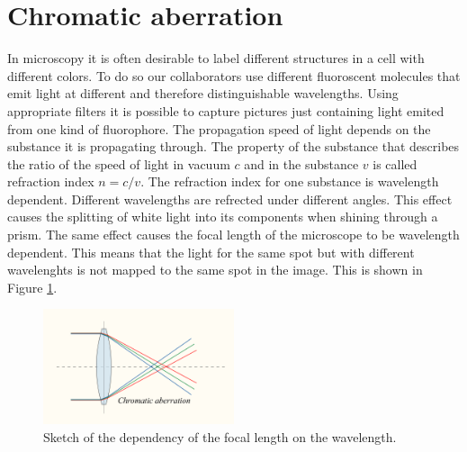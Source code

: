 \section{Chromatic aberration}
In microscopy it is often desirable to label different structures in a cell with
different colors. To do so our collaborators use different fluoroscent molecules
that emit light at different and therefore distinguishable wavelengths. Using appropriate
filters it is possible to capture pictures just containing light emited from one
kind of fluorophore.\newline
The propagation speed of light depends on the substance it is propagating through. The property of the substance that describes the ratio of the speed of light in vacuum $c$ and in the substance $v$ is called refraction index $n = c/v$.\newline
The refraction index for one substance is wavelength dependent. Different wavelengths are refrected under different angles. This effect causes the splitting of white light into its components when shining through a prism.\newline
The same effect causes the focal length of the microscope to be wavelength dependent. This means that the light for the same spot but with
different wavelenghts is not mapped to the same spot in the image. This is shown in Figure \ref{wikibild1}.

\begin{figure}
	\centering
	\includegraphics[width = 0.5\textwidth]{pictures/bildabberationwiki.png}
	\caption[Chromatic aberration, picture taken from http://en.wikipedia.org/wiki /File:Chromatic\_abberation\_lens\_diagram.svg, at 23rd of May 2013]{Sketch of the dependency of the focal length on the wavelength.}
	\label{wikibild1}
	\end{figure}
